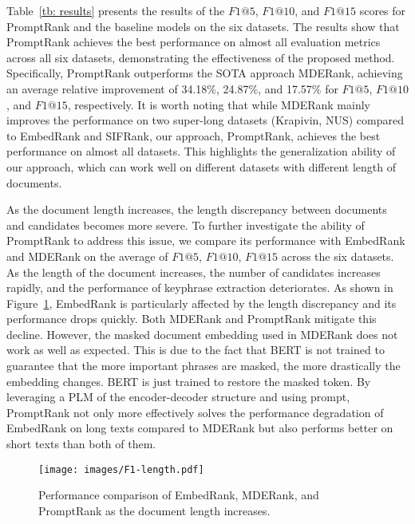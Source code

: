 \documentclass[11pt]{article}
\begin{document}
 
Table~\ref{tb: results} presents the results of the $F1@5$, $F1@10$, and $F1@15$ scores for PromptRank and the baseline models on the six datasets. The results show that PromptRank achieves the best performance on almost all evaluation metrics across all six datasets, demonstrating the effectiveness of the proposed method. Specifically, PromptRank outperforms the SOTA approach MDERank, achieving an average relative improvement of 34.18$\%$, 24.87$\%$, and 17.57$\%$ for $F1@5$, $F1@10$, and $F1@15$, respectively. It is worth noting that while MDERank mainly improves the performance on two super-long datasets (Krapivin, NUS) compared to EmbedRank and SIFRank, our approach, PromptRank, achieves the best performance on almost all datasets. This highlights the generalization ability of our approach, which can work well on different datasets with different length of documents. 



As the document length increases, the length discrepancy between documents and candidates becomes more severe. To further investigate the ability of PromptRank to address this issue, we compare its performance with EmbedRank and MDERank on the average of $F1@5$, $F1@10$, $F1@15$ across the six datasets. As the length of the document increases, the number of candidates increases rapidly, and the performance of keyphrase extraction deteriorates. As shown in Figure~\ref{fg: comparison}, EmbedRank is particularly affected by the length discrepancy and its performance drops quickly. Both MDERank and PromptRank mitigate this decline. However, the masked document embedding used in MDERank does not work as well as expected. This is due to the fact that BERT is not trained to guarantee that the more important phrases are masked, the more drastically the embedding changes. BERT is just trained to restore the masked token. By leveraging a PLM of the encoder-decoder structure and using prompt, PromptRank not only more effectively solves the performance degradation of EmbedRank on long texts compared to MDERank but also performs better on short texts than both of them.




\begin{figure}[!t]
\centerline{\texttt{[image: images/F1-length.pdf]}}
\caption{Performance comparison of EmbedRank, MDERank, and PromptRank as the document length increases. } 
\label{fg: comparison}
\end{figure}
\end{document}
